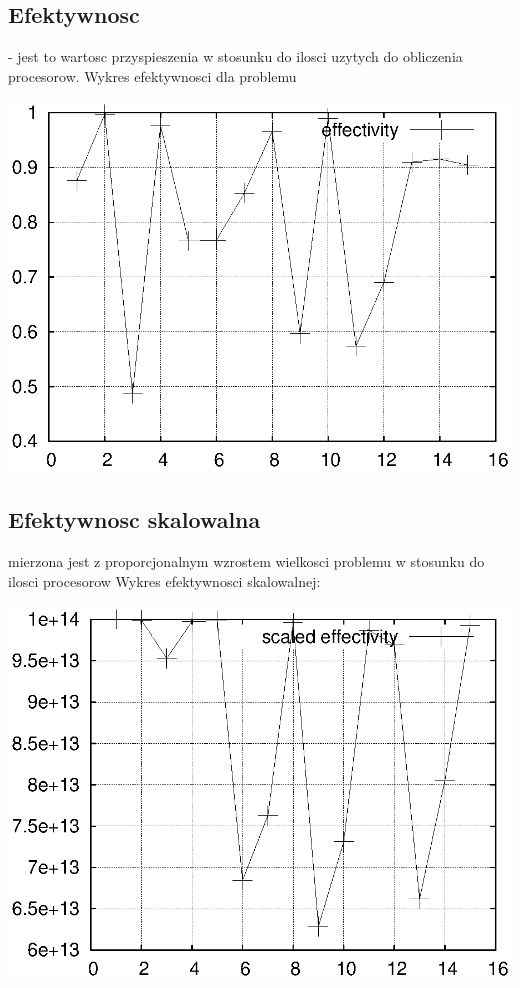 \documentclass{article}
\begin{document}
\subsection{Efektywnosc}  - jest to wartosc przyspieszenia w stosunku do ilosci uzytych do obliczenia procesorow.
Wykres efektywnosci dla problemu

\includegraphics{effect.eps}

\subsection{Efektywnosc skalowalna}
mierzona jest z proporcjonalnym wzrostem wielkosci problemu w stosunku do ilosci procesorow
Wykres efektywnosci skalowalnej:

\includegraphics{effect_sc.eps}
\end{document}

